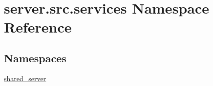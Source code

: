 \hypertarget{namespaceserver_1_1src_1_1services}{}\section{server.\+src.\+services Namespace Reference}
\label{namespaceserver_1_1src_1_1services}
\subsection*{Namespaces}
\begin{DoxyCompactItemize}
\item 
 \hyperlink{namespaceserver_1_1src_1_1services_1_1shared__server}{shared\+\_\+server}
\end{DoxyCompactItemize}
